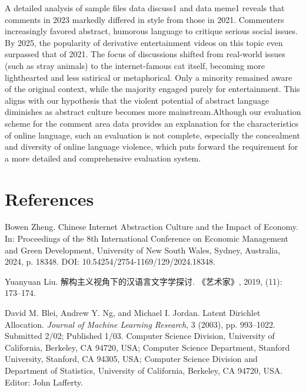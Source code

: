 \documentclass[12pt,a4paper]{ctexart}
\theoremstyle{MyLineTheoremStyle}
\theoremstyle{MyBlockTheoremStyle}
\theoremstyle{MySubsubsectionStyle}
\begin{document}
A detailed analysis of sample files data discuss1 and data meme1 reveals that comments in 2023 markedly differed in style from those in 2021. Commenters increasingly favored abstract, humorous language to critique serious social issues. By 2025, the popularity of derivative entertainment videos on this topic even surpassed that of 2021. The focus of discussions shifted from real-world issues (such as stray animals) to the internet-famous cat itself, becoming more lighthearted and less satirical or metaphorical. Only a minority remained aware of the original context, while the majority engaged purely for entertainment. This aligns with our hypothesis that the violent potential of abstract language diminishes as abstract culture becomes more mainstream.Although our evaluation scheme for the comment area data provides an explanation for the characteristics of online language, such an evaluation is not complete, especially the concealment and diversity of online language violence, which puts forward the requirement for a more detailed and comprehensive evaluation system.

\section{References}

\begin{thebibliography}{99} %

Bowen Zheng.
\newblock Chinese Internet Abstraction Culture and the Impact of Economy.
\newblock In: Proceedings of the 8th International Conference on Economic Management and Green Development, University of New South Wales, Sydney, Australia, 2024, p. 18348.
\newblock DOI: 10.54254/2754-1169/129/2024.18348.

Yuanyuan Liu.
\newblock 解构主义视角下的汉语言文字学探讨.
\newblock 《艺术家》, 2019, (11): 173--174.

David M. Blei, Andrew Y. Ng, and Michael I. Jordan.
\newblock Latent Dirichlet Allocation.
\newblock \textit{Journal of Machine Learning Research}, 3 (2003), pp. 993--1022.
\newblock Submitted 2/02; Published 1/03.
\newblock Computer Science Division, University of California, Berkeley, CA 94720, USA; Computer Science Department, Stanford University, Stanford, CA 94305, USA; Computer Science Division and Department of Statistics, University of California, Berkeley, CA 94720, USA.
\newblock Editor: John Lafferty.


\end{thebibliography}
\end{document}
